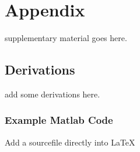 \chapter{Appendix}
\label{c:appendix}

supplementary material goes here.

\section{Derivations}
\label{s:appendic_derivations}

add some derivations here.


\newpage
\subsection{Example Matlab Code}
\label{ss:app_kalman_matlab}

Add a sourcefile directly into \LaTeX














